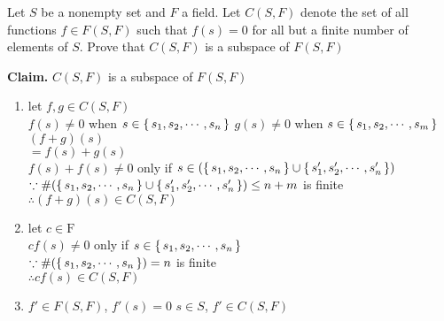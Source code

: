 Let $S$ be a nonempty set and $F$ a field. Let $C(S,F)$ denote the set of all functions $f \in F(S,F)$ such that $f(s) = 0$ for all but a finite number of elements of $S$. Prove that $C(S,F)$ is a subspace of $F(S,F)$

\begin{tcolorbox}
	\begin{solution}
		\textbf{Claim.} $C(S,F)$ is a subspace of $F(S,F)$
		
		\begin{enumerate}
			\item let $f,g \in C(S,F)$\\
			$f(s) \neq 0$ when $s \in \left\{ \,s_1,s_2,\cdots,s_n \,\right\}$
			$g(s) \neq 0$ when $s \in \left\{ \,s_1,s_2,\cdots,s_m \,\right\}$
			$(f+g)(s)$\\
			$=f(s)+g(s)$\\
			$ f(s)+f(s) \neq 0 $ only if $s \in (\left\{ \,s_1,s_2,\cdots,s_n \,\right\}\cup\left\{ \,s'_1,s'_2,\cdots,s'_n \,\right\})$\\
			$\because \#(\left\{ \,s_1,s_2,\cdots,s_n \,\right\}\cup\left\{ \,s'_1,s'_2,\cdots,s'_n \,\right\}) \leq n+m$ is finite\\
			$\therefore (f+g)(s) \in C(S,F)$
			\item let $c \in \mathrm{F}$\\
			$cf(s) \neq 0$ only if $s \in \left\{ \,s_1,s_2,\cdots,s_n \,\right\}$\\
			$\because \#(\left\{ \,s_1,s_2,\cdots,s_n \,\right\}) = n$ is finite\\
			$\therefore cf(s) \in C(S,F)$
			\item $f' \in F(S,F)$,
			$f'(s) = 0 \,\, s\in S$,
			$f' \in C(S,F)$
		\end{enumerate}
	\end{solution}	
\end{tcolorbox}